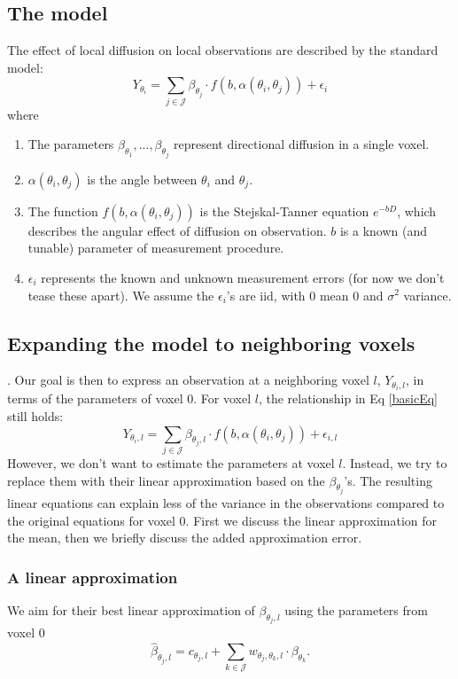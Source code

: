 \documentclass[11pt]{amsart}
\newcommand{\tj}{\theta_j}
\newcommand{\ti}{\theta_i}
\newcommand{\tk}{\theta_k}
\newcommand{\yti}{Y_{\theta_i}}
\newcommand{\ytil}{Y_{\theta_i,l}}
\begin{document}
\subsection{The model}
The effect of local diffusion on local observations are described by the standard model:
\begin{equation}
\yti = \sum_{j \in \mathcal{J}} \beta_{\tj} \cdot f(b, \alpha(\ti, \tj)) + \epsilon_i 
\label{basicEq}
\end{equation}
where 
\begin{enumerate}
\item The parameters $\beta_{\theta_1},...,\beta_{\tj}$ represent directional diffusion in a single voxel. 
\item $\alpha(\ti, \tj)$ is the angle between $\ti$ and $\tj$.
\item The function $f(b, \alpha(\ti, \tj))$ is the Stejskal-Tanner equation $e^{-b D}$, which describes the 
angular effect of diffusion on observation.  
$b$ is a known (and tunable) parameter of measurement procedure.   
\item $\epsilon_i $ represents the known and unknown measurement errors (for now we don't 
tease these apart). We assume the $\epsilon_i$'s are iid, with $0$ mean $0$ and $\sigma^2$ variance.
\end{enumerate}

\subsection{Expanding the model to neighboring voxels}.
Our goal is then to express an observation at a neighboring voxel $l$, $\ytil$, in terms of the parameters 
of voxel 0. For voxel $l$, the relationship in Eq \eqref{basicEq} still holds:
\begin{equation}
\ytil = \sum_{j \in \mathcal{J}} \beta_{\tj,l} \cdot f(b, \alpha(\ti, \tj)) + \epsilon_{i,l} 
\label{neighbor}
\end{equation}
However, we don't want to estimate the parameters at voxel $l$.
Instead, we try to replace them with their linear approximation based on the $\beta_{\tj}$'s. 
The resulting linear equations can explain less of the variance in the observations compared to the original
equations for voxel 0. First we discuss the linear approximation for the mean, 
then we briefly discuss the added approximation error. 

\subsubsection{A linear approximation}
We aim for their best linear approximation of $\beta_{\tj,l}$ using the 
parameters from voxel 0
\begin{equation}
\hat{\beta}_{\tj,l} = c_{\tj,l} + \sum_{k\in\mathcal{J}} w_{\tj,\tk, l} \cdot \beta_{\tk}. 
\end{equation} 
\end{document}
